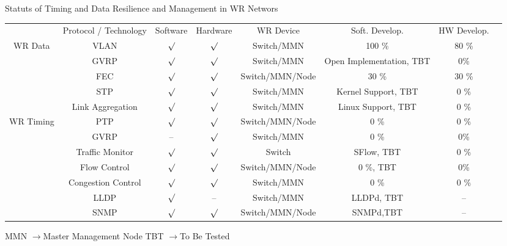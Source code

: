\documentclass[a4paper,11pt]{report}
\newcommand\pfeil{$\rightarrow$}
\newcommand\visto{$\surd$}
\begin{document}
\begin{landscape}

\thispagestyle{empty}

\begin{center}
\LARGE{Statuts of Timing and Data Resilience and Management in WR Networs}

\end{center}

\begin{table}[ht]
\centering
        \begin{tabular}{ c |  c |  c  |  c  |  c  |  c  |  c  |  c  |}          \cline{2-7}
&Protocol / Technology & Software & Hardware & WR Device & Soft. Develop. & HW Develop. \\ \cline{1-7}

	\multicolumn{1}{|c|}{\multirow{3}{*}{WR Data}} &
	\multicolumn{1}{|c|}{VLAN}	& \visto&\visto	&Switch/MMN	&100 \%		&80 \%	\\ \cline{2-7}
\multicolumn{1}{|c|}{} &
\multicolumn{1}{|c|}{GVRP}	&\visto&$\surd$	&Switch/MMN	&Open Implementation, TBT	&0\% 	\\ \cline{2-7} 
\multicolumn{1}{|c|}{} &
\multicolumn{1}{|c|}{FEC}	&\visto	&\visto&Switch/MMN/Node	&30 \%		&30 \% 	\\ \cline{2-7} 
\multicolumn{1}{|c|}{} &
\multicolumn{1}{|c|}{STP}	&\visto &\visto	&Switch/MMN	&Kernel Support, TBT	& 0 \%	\\ \cline{2-7}
\multicolumn{1}{|c|}{} &
\multicolumn{1}{|c|}{Link Aggregation}&\visto &\visto&Switch/MMN &Linux Support, TBT	& 0 \%		\\ 		
\hline
\hline

\multicolumn{1}{|c|}{\multirow{3}{*}{WR Timing}} &
\multicolumn{1}{|c|}{PTP}	& \visto  &\visto	&Switch/MMN/Node& 0 \%		&0 \%	\\ \cline{2-7}
\multicolumn{1}{|c|}{} &
\multicolumn{1}{|c|}{GVRP}	&--		&$\surd$&Switch/MMN& 0 \%	&0\% 	\\	 \cline{2-7} 
\hline
\hline

\multicolumn{1}{|c|}{\multirow{3}{*}{Resilience \& Management}} &
\multicolumn{1}{|c|}{Traffic Monitor}	& \visto&\visto&Switch	& SFlow, TBT & 0 \%	\\ \cline{2-7}
\multicolumn{1}{|c|}{} &
\multicolumn{1}{|c|}{Flow Control}	&\visto&$\surd$	&Switch/MMN/Node &0 \%, TBT	&0\% 	\\ \cline{2-7} 
\multicolumn{1}{|c|}{} &
\multicolumn{1}{|c|}{Congestion Control}	&\visto	&\visto&Switch/MMN	&0 \%		&0 \% 	\\ \cline{2-7} 
\multicolumn{1}{|c|}{} &
\multicolumn{1}{|c|}{LLDP}	&\visto & --	&Switch/MMN	&LLDPd, TBT	& --	\\ \cline{2-7}
\multicolumn{1}{|c|}{} &
\multicolumn{1}{|c|}{SNMP}&\visto &\visto&	Switch/MMN/Node& SNMPd,TBT	& --	\\ 		
\hline



\end{tabular}
\end{table}

MMN \pfeil Master Management Node
TBT \pfeil To Be Tested


\end{landscape}
\end{document}
